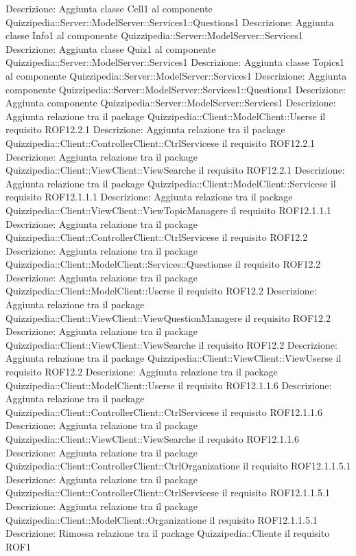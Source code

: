 Descrizione: Aggiunta classe Cell1 al componente Quizzipedia::Server::ModelServer::Services1::Questions1 
Descrizione: Aggiunta classe Info1 al componente Quizzipedia::Server::ModelServer::Services1 
Descrizione: Aggiunta classe Quiz1 al componente Quizzipedia::Server::ModelServer::Services1 
Descrizione: Aggiunta classe Topics1 al componente Quizzipedia::Server::ModelServer::Services1 
Descrizione: Aggiunta componente Quizzipedia::Server::ModelServer::Services1::Questions1 
Descrizione: Aggiunta componente Quizzipedia::Server::ModelServer::Services1 
Descrizione: Aggiunta relazione tra il package Quizzipedia::Client::ModelClient::Userse il requisito ROF12.2.1 
Descrizione: Aggiunta relazione tra il package Quizzipedia::Client::ControllerClient::CtrlServicese il requisito ROF12.2.1 
Descrizione: Aggiunta relazione tra il package Quizzipedia::Client::ViewClient::ViewSearche il requisito ROF12.2.1 
Descrizione: Aggiunta relazione tra il package Quizzipedia::Client::ModelClient::Servicese il requisito ROF12.1.1.1 
Descrizione: Aggiunta relazione tra il package Quizzipedia::Client::ViewClient::ViewTopicManagere il requisito ROF12.1.1.1 
Descrizione: Aggiunta relazione tra il package Quizzipedia::Client::ControllerClient::CtrlServicese il requisito ROF12.2 
Descrizione: Aggiunta relazione tra il package Quizzipedia::Client::ModelClient::Services::Questionse il requisito ROF12.2 
Descrizione: Aggiunta relazione tra il package Quizzipedia::Client::ModelClient::Userse il requisito ROF12.2 
Descrizione: Aggiunta relazione tra il package Quizzipedia::Client::ViewClient::ViewQuestionManagere il requisito ROF12.2 
Descrizione: Aggiunta relazione tra il package Quizzipedia::Client::ViewClient::ViewSearche il requisito ROF12.2 
Descrizione: Aggiunta relazione tra il package Quizzipedia::Client::ViewClient::ViewUserse il requisito ROF12.2 
Descrizione: Aggiunta relazione tra il package Quizzipedia::Client::ModelClient::Userse il requisito ROF12.1.1.6 
Descrizione: Aggiunta relazione tra il package Quizzipedia::Client::ControllerClient::CtrlServicese il requisito ROF12.1.1.6 
Descrizione: Aggiunta relazione tra il package Quizzipedia::Client::ViewClient::ViewSearche il requisito ROF12.1.1.6 
Descrizione: Aggiunta relazione tra il package Quizzipedia::Client::ControllerClient::CtrlOrganizatione il requisito ROF12.1.1.5.1 
Descrizione: Aggiunta relazione tra il package Quizzipedia::Client::ControllerClient::CtrlServicese il requisito ROF12.1.1.5.1 
Descrizione: Aggiunta relazione tra il package Quizzipedia::Client::ModelClient::Organizatione il requisito ROF12.1.1.5.1 
Descrizione: Rimossa relazione tra il package Quizzipedia::Cliente il requisito ROF1 
